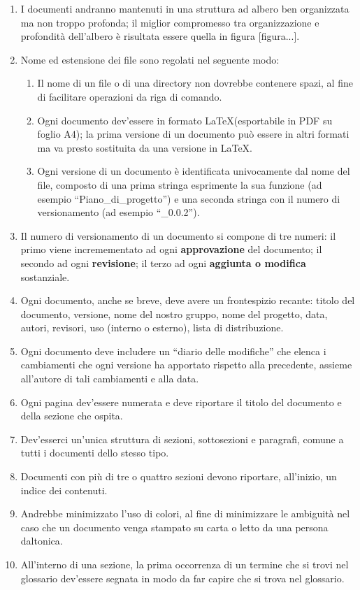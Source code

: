 \begin{enumerate}
	\item I documenti andranno mantenuti in una struttura ad albero ben organizzata ma non troppo profonda; il miglior compromesso tra organizzazione e profondità dell'albero è risultata essere quella in figura [figura...].
	\item Nome ed estensione dei file sono regolati nel seguente modo:
	\begin{enumerate}
		\item Il nome di un file o di una directory non dovrebbe contenere spazi, al fine di facilitare operazioni da riga di comando.
		\item Ogni documento dev'essere in formato \LaTeX (esportabile in PDF su foglio A4); la prima versione di un documento può essere in altri formati ma va presto sostituita da una versione in \LaTeX.
		\item Ogni versione di un documento è identificata univocamente dal nome del file, composto di una prima stringa esprimente la sua funzione (ad esempio “Piano\_di\_progetto”) e una seconda stringa con il numero di versionamento (ad esempio “\_0.0.2”).
	\end{enumerate}
	\item Il numero di versionamento di un documento si compone di tre numeri: il primo viene incremementato ad ogni \textbf{approvazione} del documento; il secondo ad ogni \textbf{revisione}; il terzo ad ogni \textbf{aggiunta o modifica} sostanziale.
	\item Ogni documento, anche se breve, deve avere un frontespizio recante: titolo del documento, versione, nome del nostro gruppo, nome del progetto, data, autori, revisori, uso (interno o esterno), lista di distribuzione. %
	\item Ogni documento deve includere un “diario delle modifiche” che elenca i cambiamenti che ogni versione ha apportato rispetto alla precedente, assieme all'autore di tali cambiamenti e alla data.
	\item Ogni pagina dev'essere numerata e deve riportare il titolo del documento e della sezione che ospita. %
	\item Dev'esserci un'unica struttura di sezioni, sottosezioni e paragrafi, comune a tutti i documenti dello stesso tipo.
	\item Documenti con più di tre o quattro sezioni devono riportare, all'inizio, un indice dei contenuti.
	\item Andrebbe minimizzato l'uso di colori, al fine di minimizzare le ambiguità nel caso che un documento venga stampato su carta o letto da una persona daltonica.
	\item All'interno di una sezione, la prima occorrenza di un termine che si trovi nel glossario dev'essere segnata in modo da far capire che si trova nel glossario.
\end{enumerate}

